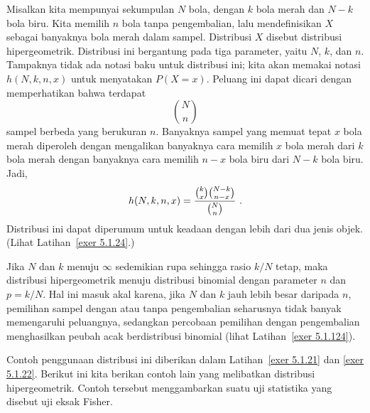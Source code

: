 Misalkan kita mempunyai sekumpulan $N$ bola, dengan $k$ bola merah dan $N-k$ bola
biru. Kita memilih $n$ bola tanpa pengembalian, lalu mendefinisikan $X$ sebagai
banyaknya bola merah dalam sampel. Distribusi $X$ disebut distribusi hipergeometrik.
Distribusi ini bergantung pada tiga parameter, yaitu $N$, $k$, dan $n$. Tampaknya
tidak ada notasi baku untuk distribusi ini; kita akan memakai notasi $h(N, k, n, x)$
untuk menyatakan $P(X = x)$. Peluang ini dapat dicari dengan memperhatikan bahwa
terdapat
$${N \choose n}$$ sampel berbeda yang berukuran $n$. Banyaknya sampel yang memuat
tepat $x$ bola merah diperoleh dengan mengalikan banyaknya cara memilih $x$ bola
merah dari $k$ bola merah dengan banyaknya cara memilih $n-x$ bola biru dari $N-k$
bola biru. Jadi,
$$h(N, k, n, x) = {{{{k}\choose{x}}{{N-k}\choose{n-x}}}\over{{{N}\choose{n}}}}\ .$$ 
Distribusi ini dapat diperumum untuk keadaan dengan lebih dari dua jenis objek.
(Lihat Latihan~\ref{exer 5.1.24}.)
\par 
Jika $N$ dan $k$ menuju $\infty$ sedemikian rupa sehingga rasio $k/N$ tetap, maka
distribusi hipergeometrik menuju distribusi binomial dengan parameter $n$ dan
$p = k/N$. Hal ini masuk akal karena, jika $N$ dan $k$ jauh lebih besar daripada
$n$, pemilihan sampel dengan atau tanpa pengembalian seharusnya tidak banyak
memengaruhi peluangnya, sedangkan percobaan pemilihan dengan pengembalian menghasilkan
peubah acak berdistribusi binomial (lihat Latihan~\ref{exer 5.1.124}).
\par Contoh penggunaan distribusi ini diberikan dalam Latihan~\ref{exer
5.1.21} dan \ref{exer 5.1.22}. Berikut ini kita berikan contoh lain yang melibatkan distribusi
hipergeometrik. Contoh tersebut menggambarkan suatu uji statistika yang disebut uji
eksak Fisher.
